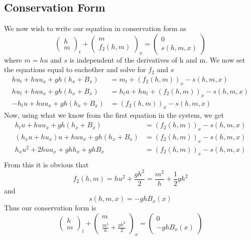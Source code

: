 \subsection{Conservation Form}
We now wish to write our equation in conservation form as 
$$\begin{pmatrix}
h\\m	
\end{pmatrix}_t + \begin{pmatrix}
m\\ f_2(h,m)
\end{pmatrix}_x = \begin{pmatrix}
0\\s(h,m,x)
\end{pmatrix}$$
where $m=hu$ and $s$ is independent of the derivatives of h and m. We now set the equations equal to eachother and solve for $f_2$ and $s$
\begin{align*}
hu_t+huu_x + gh(h_x+B_x)&=m_t+(f_2(h,m))_x - s(h,m,x) \\
hu_t+huu_x + gh(h_x+B_x)&=h_tu+hu_t+(f_2(h,m))_x - s(h,m,x) \\
-h_tu+huu_x + gh(h_x+B_x)&=(f_2(h,m))_x - s(h,m,x)
\end{align*}
Now, using what we know from the first equation in the system, we get
\begin{align*}
h_tu+huu_x + gh(h_x+B_x)&=(f_2(h,m))_x - s(h,m,x) \\
(h_x u+hu_x)u+huu_x + gh(h_x+B_x)&=(f_2(h,m))_x - s(h,m,x) \\
h_x u^2+2huu_x + ghh_x+ghB_x &=(f_2(h,m))_x - s(h,m,x) \\
\end{align*}
From this it is obvious that
$$f_2(h,m)=h u^2 + \frac{gh^2}{2} = \frac{m^2}{h} + \frac{1}{2}gh^2$$ and
$$s(h,m,x)=-ghB_x(x)$$
Thus our conservation form is 
$$\begin{pmatrix}
h\\m	
\end{pmatrix}_t + \begin{pmatrix}
m\\ \frac{m^2}{h} + \frac{gh^2}{2}
\end{pmatrix}_x = \begin{pmatrix}
0\\-ghB_x(x)
\end{pmatrix}$$
